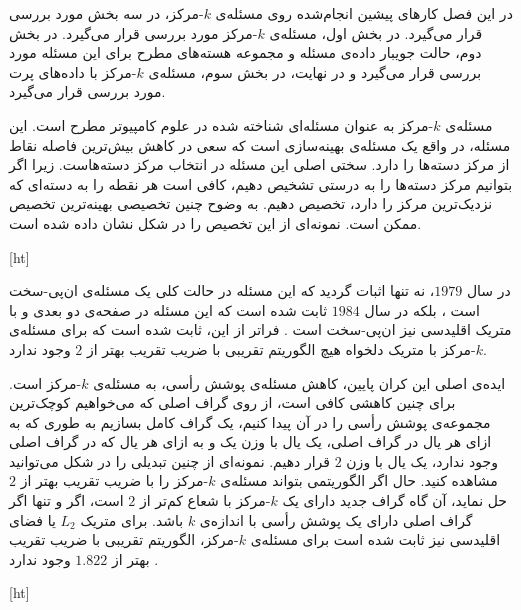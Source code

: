 

در این فصل کارهای پیشین انجام‌شده روی مسئله‌ی $k$-مرکز، در سه بخش مورد بررسی قرار می‌گیرد.
در بخش اول، مسئله‌ی $k$-مرکز مورد بررسی قرار می‌گیرد.
در بخش دوم، حالت جویبار داده‌ی مسئله و مجموعه هسته‌های مطرح برای این مسئله مورد بررسی قرار می‌گیرد و در نهایت، در بخش سوم، مسئله‌ی $k$-مرکز با داده‌های پرت مورد بررسی قرار می‌گیرد.


مسئله‌ی $k$-مرکز به عنوان مسئله‌ای شناخته شده در علوم کامپیوتر مطرح است.
این مسئله، در واقع یک مسئله‌ی بهینه‌سازی است که سعی در کاهش بیش‌ترین فاصله نقاط از مرکز دسته‌ها را دارد.
سختی اصلی این مسئله در انتخاب مرکز دسته‌هاست.
زیرا اگر بتوانیم مرکز دسته‌ها را به درستی تشخیص دهیم، کافی است هر نقطه را به دسته‌ای که نزدیک‌ترین مرکز را دارد، تخصیص دهیم.
به وضوح چنین تخصیصی بهینه‌ترین تخصیص ممکن است.
نمونه‌ای از این تخصیص را در شکل  نشان داده شده است.

[ht]

در سال $1979$، نه تنها اثبات گردید که این مسئله در حالت کلی یک مسئله‌ی ان‌پی-سخت است ، بلکه در سال $1984$ ثابت شده است که این مسئله در صفحه‌ی دو بعدی و با متریک اقلیدسی نیز ان‌پی-سخت است .
فراتر از این، ثابت شده است که برای مسئله‌ی $k$-مرکز با متریک دلخواه هیچ الگوریتم تقریبی با ضریب تقریب بهتر از $2$ وجود ندارد.

ایده‌ی اصلی این کران پایین، کاهش مسئله‌ی پوشش رأسی، به مسئله‌ی $k$-مرکز است.
برای چنین کاهشی کافی است، از روی گراف اصلی که می‌خواهیم کوچک‌ترین مجموعه‌ی پوشش رأسی را در آن پیدا کنیم، یک گراف کامل بسازیم به طوری که به ازای هر یال در گراف اصلی، یک یال با وزن یک و به ازای هر یال که در گراف اصلی وجود ندارد، یک یال با وزن $2$ قرار دهیم.
نمونه‌ای از چنین تبدیلی را در شکل  می‌توانید مشاهده کنید.
حال اگر الگوریتمی بتواند مسئله‌ی $k$-مرکز را با ضریب تقریب بهتر از $2$ حل نماید، آن گاه گراف جدید دارای یک $k$-مرکز با شعاع کم‌تر از $2$ است، اگر و تنها اگر گراف اصلی دارای یک پوشش رأسی با اندازه‌ی $k$ باشد.
برای متریک $L_2$ یا فضای اقلیدسی نیز ثابت شده است برای مسئله‌ی $k$-مرکز، الگوریتم تقریبی با ضریب تقریب بهتر از $1.822$ وجود ندارد .

[ht]

